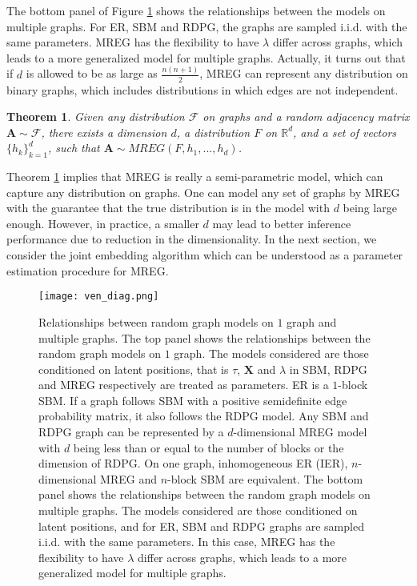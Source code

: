 \documentclass[10pt,journal,compsoc]{IEEEtran}
\newtheorem{theorem}{Theorem}[section]
\newcommand{\bA}{\mathbf{A}}
\newcommand{\bX}{\mathbf{X}}
\begin{document}
\noindent The bottom panel of Figure \ref{fig:ven} shows the relationships between the models on multiple graphs. For ER, SBM  and RDPG, the graphs are sampled i.i.d. with the same parameters. MREG has the flexibility to have $\lambda$ differ across graphs, which leads to a more generalized model for multiple graphs. Actually, it turns out that if $d$ is allowed to be as large as $\frac{n(n+1)}{2}$, MREG can represent any distribution on binary graphs, which includes distributions in which edges are not independent.   
\begin{theorem}
	Given any distribution $\mathcal{F}$ on graphs and a random adjacency matrix $\bA \sim \mathcal{F}$, there exists a dimension  $d$, a distribution $F$ on $\mathbb{R}^d$, and a set of vectors $\{h_k\}_{k=1}^d$, such that $\bA \sim MREG(F,h_1,...,h_d)$.
	\label{thm:rep}
\end{theorem}
Theorem \ref{thm:rep} implies that MREG is really a semi-parametric model, which can capture any distribution on graphs. One can model any set of graphs by MREG with the guarantee that the true distribution is in the model with $d$ being large enough. However, in practice, a smaller $d$ may lead to better inference performance due to reduction in the dimensionality. In the next section, we consider the joint embedding algorithm which can be understood as a parameter estimation procedure for MREG.
\begin{figure}[!htbp]
	\centering
	\texttt{[image: ven\_diag.png]}
	\caption{Relationships between random graph models on $1$ graph and multiple graphs. The top panel shows the relationships between the random graph models on $1$ graph. The models considered are those conditioned on latent positions, that is $\tau$, $\bX$ and $\lambda$ in SBM, RDPG and MREG respectively are treated as parameters. ER is a $1$-block SBM. If a graph follows SBM with a positive semidefinite edge probability matrix, it also follows the RDPG model. Any  SBM and  RDPG graph can be represented by a $d$-dimensional MREG model with $d$ being less than or equal to the number of blocks or the dimension of RDPG. On one graph, inhomogeneous ER (IER), $n$-dimensional MREG and $n$-block SBM are equivalent. The bottom panel shows the relationships between the random graph models on multiple graphs. The models considered are those conditioned on latent positions, and for ER, SBM and RDPG graphs are sampled i.i.d. with the same parameters. In this case, MREG has the flexibility to have $\lambda$ differ across graphs, which leads to a more generalized model for multiple graphs.}
	\label{fig:ven}
\end{figure}
\end{document}
